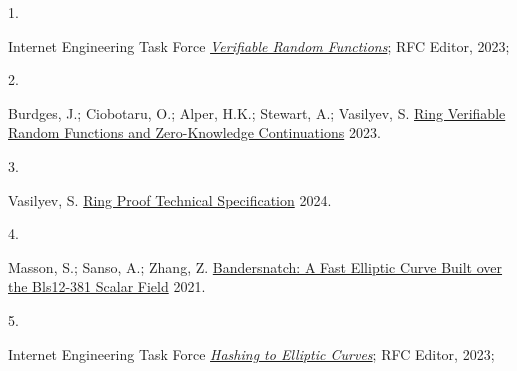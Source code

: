 \documentclass[
]{article}
\newlength{\cslhangindent}
\newlength{\csllabelwidth}
\newlength{\cslentryspacingunit} %
\newenvironment{CSLReferences}[2] %
 {%
  \setlength{\parindent}{0pt}
  \ifodd #1
  \let\oldpar\par
  \def\par{\hangindent=\cslhangindent\oldpar}
  \fi
  \setlength{\parskip}{#2\cslentryspacingunit}
 }%
 {}
\newcommand{\CSLLeftMargin}[1]{\parbox[t]{\csllabelwidth}{#1}}
\newcommand{\CSLRightInline}[1]{\parbox[t]{\linewidth - \csllabelwidth}{#1}\break}
\begin{document}
\hypertarget{refs}{}
\begin{CSLReferences}{0}{0}
\leavevmode{}%
\CSLLeftMargin{1. }
\CSLRightInline{Internet Engineering Task Force
\emph{\href{https://datatracker.ietf.org/doc/rfc9381}{{Verifiable Random
Functions}}}; {RFC Editor}, 2023;}

\leavevmode{}%
\CSLLeftMargin{2. }
\CSLRightInline{Burdges, J.; Ciobotaru, O.; Alper, H.K.; Stewart, A.;
Vasilyev, S. \href{https://eprint.iacr.org/2023/002}{Ring Verifiable
Random Functions and Zero-Knowledge Continuations} 2023.}

\leavevmode{}%
\CSLLeftMargin{3. }
\CSLRightInline{Vasilyev, S.
\href{https://hackmd.io/ulW5nFFpTwClHsD0kusJAA}{Ring Proof Technical
Specification} 2024.}

\leavevmode{}%
\CSLLeftMargin{4. }
\CSLRightInline{Masson, S.; Sanso, A.; Zhang, Z.
\href{https://eprint.iacr.org/2021/1152}{Bandersnatch: A Fast Elliptic
Curve Built over the Bls12-381 Scalar Field} 2021.}

\leavevmode{}%
\CSLLeftMargin{5. }
\CSLRightInline{Internet Engineering Task Force
\emph{\href{https://datatracker.ietf.org/doc/rfc9380}{{Hashing to
Elliptic Curves}}}; {RFC Editor}, 2023;}

\end{CSLReferences}
\end{document}

